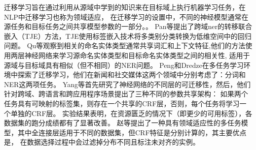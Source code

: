 

迁移学习旨在通过利用从源域中学到的知识来在目标域上执行机器学习任务\cite{pan2009survey}，在NLP中迁移学习也称为领域适应，
在迁移学习的设置中，不同的神经模型通常在源任务和目标任务之间共享模型参数的一部分。。 
Pan等提出了跨域ner的转移联合嵌入（TJE）方法，TJE使用标签嵌入技术将多类别分类转换为低维空间中的回归问题\cite{pan2013transfer}。 
Qu等观察到相关的命名实体类型通常共享词汇和上下文特征\cite{qu2016named},他们的方法使用两层神经网络来学习源命名实体类型和目标命名实体类型之间的相关性,
适用于源域与目标域具有相似（但不相同）的NER问题。 
Peng和Dredze在多任务学习环境中探索了迁移学习\cite{peng2016multi}，他们在新闻和社交媒体这两个领域中分别考虑了：分词和NER这两项任务。
Yang等首先研究了神经网络的不同层的可迁移性\cite{yang2017transfer}，然后，他们针对跨域、跨语言和跨应用程序场景提出了三种不同的参数共享架构：
如果两个任务具有可映射的标签集，则存在一个共享的CRF层，否则，每个任务将学习一个单独的CRF层。
实验结果表明，在资源匮乏的情况下（即更少的可用标签），各数据集的跑分成绩都有了显著改善。 
赵等提出了一种具有领域适应性的多任务模型，其中全连接层适用于不同的数据集，但CRF特征是分别计算的，其主要优点是，
在数据选择过程中会过滤掉分布不同且标注未对齐的实例\cite{zhao2018improve}。




